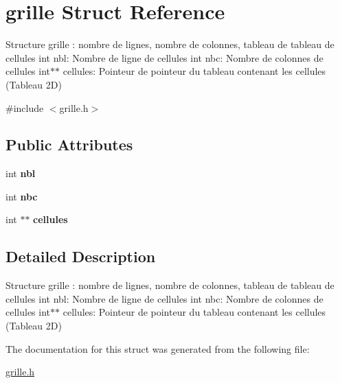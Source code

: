 \hypertarget{structgrille}{}\section{grille Struct Reference}
\label{structgrille}


Structure grille \+: nombre de lignes, nombre de colonnes, tableau de tableau de cellules int nbl\+: Nombre de ligne de cellules int nbc\+: Nombre de colonnes de cellules int$\ast$$\ast$ cellules\+: Pointeur de pointeur du tableau contenant les cellules (Tableau 2D)  




{\ttfamily \#include $<$grille.\+h$>$}

\subsection*{Public Attributes}
\begin{DoxyCompactItemize}
\item 
int {\bfseries nbl}\hypertarget{structgrille_a0b4da1e205825df205b0c004d105d62a}{}\label{structgrille_a0b4da1e205825df205b0c004d105d62a}

\item 
int {\bfseries nbc}\hypertarget{structgrille_a48d6706d41bee6fff9200d872b8b0cd0}{}\label{structgrille_a48d6706d41bee6fff9200d872b8b0cd0}

\item 
int $\ast$$\ast$ {\bfseries cellules}\hypertarget{structgrille_a428cf0c0297ce04e0206ba0067ac3b42}{}\label{structgrille_a428cf0c0297ce04e0206ba0067ac3b42}

\end{DoxyCompactItemize}


\subsection{Detailed Description}
Structure grille \+: nombre de lignes, nombre de colonnes, tableau de tableau de cellules int nbl\+: Nombre de ligne de cellules int nbc\+: Nombre de colonnes de cellules int$\ast$$\ast$ cellules\+: Pointeur de pointeur du tableau contenant les cellules (Tableau 2D) 

The documentation for this struct was generated from the following file\+:\begin{DoxyCompactItemize}
\item 
\hyperlink{grille_8h}{grille.\+h}\end{DoxyCompactItemize}
